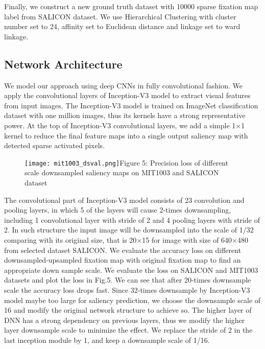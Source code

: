 \documentclass[letterpaper, 10 pt, conference]{ieeeconf}  %
\begin{document}
\par Finally, we construct a new ground truth dataset with 10000 sparse fixation map label from SALICON dataset. We use Hierarchical Clustering with cluster number set to 24, affinity set to Euclidean distance and linkage set to ward linkage.

\subsection{Network Architecture}

\par We model our approach using deep CNNs in fully convolutional fashion. We apply the convolutional layers of Inception-V3 \cite{b22} model to extract visual features from input images. The Inception-V3 model is trained on ImageNet \cite{b28} classification dataset with one million images, thus its kernels have a strong representative power. At the top of Inception-V3 convolutional layers, we add a simple 1$\times$1 kernel to reduce the final feature maps into a single output saliency map with detected sparse activated pixels.

\begin{figure}
\centering
    \texttt{[image: mit1003\_dsval.png]}{Figure 5: Precision loss of different scale downsampled saliency maps on MIT1003 and SALICON dataset\label{fig5}}
\end{figure}

\par The convolutional part of Inception-V3 model consists of 23 convolution and pooling layers, in which 5 of the layers will cause 2-times downsampling, including 1 convolutional layer with stride of 2 and 4 pooling layers with stride of 2. In such structure the input image will be downsampled into the scale of 1/32 comparing with its original size, that is 20$\times$15 for image with size of 640$\times$480 from selected dataset SALICON. We evaluate the accuracy loss on different downsampled-upsampled fixation map with original fixation map to find an appropriate down sample scale. We evaluate the loss on SALICON and MIT1003 datasets and plot the loss in Fig.5. We can see that after 20-times downsample scale the accuracy loss drops fast. Since 32-times downsample by Inception-V3 model maybe too large for saliency prediction, we choose the downsample scale of 16 and modify the original network structure to achieve so. The higher layer of DNN has a strong dependency on previous layers, thus we modify the higher layer downsample scale to minimize the effect. We replace the stride of 2 in the last inception module by 1, and keep a downsample scale of 1/16.
\end{document}
